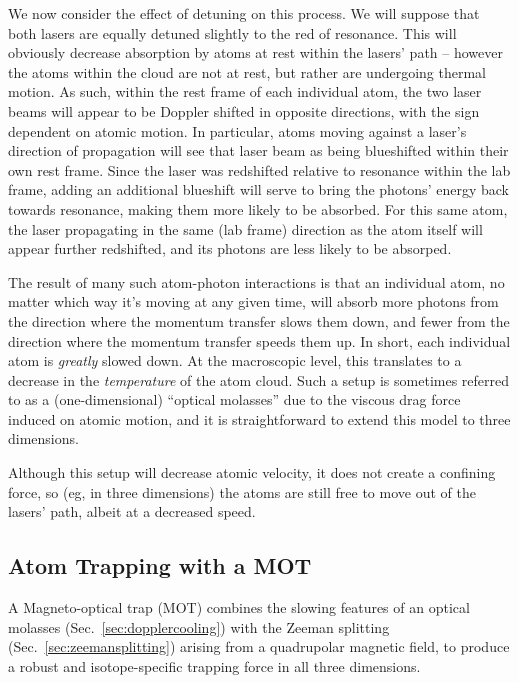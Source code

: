We now consider the effect of detuning on this process.  We will suppose that both lasers are equally detuned slightly to the red of resonance.  This will obviously decrease absorption by atoms at rest within the lasers' path -- however the atoms within the cloud are not at rest, but rather are undergoing thermal motion.  As such, within the rest frame of each individual atom, the two laser beams will appear to be Doppler shifted in opposite directions, with the sign dependent on atomic motion.  In particular, atoms moving against a laser's direction of propagation will see that laser beam as being blueshifted within their own rest frame.  Since the laser was redshifted relative to resonance within the lab frame, adding an additional blueshift will serve to bring the photons' energy back towards resonance, making them more likely to be absorbed.  For this same atom, the laser propagating in the same (lab frame) direction as the atom itself will appear further redshifted, and its photons are less likely to be absorped.  

The result of many such atom-photon interactions is that an individual atom, no matter which way it's moving at any given time, will absorb more photons from the direction where the momentum transfer slows them down, and fewer from the direction where the momentum transfer speeds them up.  In short, each individual atom is \emph{greatly} slowed down.  At the macroscopic level, this translates to a decrease in the \emph{temperature} of the atom cloud.  Such a setup is sometimes referred to as a (one-dimensional) ``optical molasses'' due to the viscous drag force induced on atomic motion, and it is straightforward to extend this model to three dimensions.

Although this setup will decrease atomic velocity, it does not create a confining force, so (eg, in three dimensions) the atoms are still free to move out of the lasers' path, albeit at a decreased speed.


\subsection{Atom Trapping with a MOT}
A Magneto-optical trap (MOT) combines the slowing features of an optical molasses (Sec.~\ref{sec:dopplercooling}) with the Zeeman splitting (Sec.~\ref{sec:zeemansplitting}) arising from a quadrupolar magnetic field, to produce a robust and isotope-specific trapping force in all three dimensions.  

